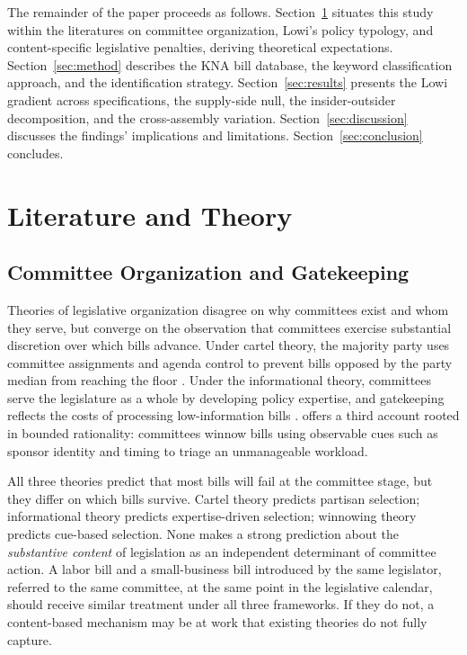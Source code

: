 \documentclass[11pt]{article}
\begin{document}
The remainder of the paper proceeds as follows. Section~\ref{sec:lit} situates this study within the literatures on committee organization, Lowi's policy typology, and content-specific legislative penalties, deriving theoretical expectations. Section~\ref{sec:method} describes the KNA bill database, the keyword classification approach, and the identification strategy. Section~\ref{sec:results} presents the Lowi gradient across specifications, the supply-side null, the insider-outsider decomposition, and the cross-assembly variation. Section~\ref{sec:discussion} discusses the findings' implications and limitations. Section~\ref{sec:conclusion} concludes.


\section{Literature and Theory}
\label{sec:lit}

\subsection{Committee Organization and Gatekeeping}
\label{sec:lit-committee}

Theories of legislative organization disagree on why committees exist and whom they serve, but converge on the observation that committees exercise substantial discretion over which bills advance. Under cartel theory, the majority party uses committee assignments and agenda control to prevent bills opposed by the party median from reaching the floor \citep{cox2005}. Under the informational theory, committees serve the legislature as a whole by developing policy expertise, and gatekeeping reflects the costs of processing low-information bills \citep{krehbiel1991}. \citet{krutz2005} offers a third account rooted in bounded rationality: committees winnow bills using observable cues such as sponsor identity and timing to triage an unmanageable workload.

All three theories predict that most bills will fail at the committee stage, but they differ on which bills survive. Cartel theory predicts partisan selection; informational theory predicts expertise-driven selection; winnowing theory predicts cue-based selection. None makes a strong prediction about the \emph{substantive content} of legislation as an independent determinant of committee action. A labor bill and a small-business bill introduced by the same legislator, referred to the same committee, at the same point in the legislative calendar, should receive similar treatment under all three frameworks. If they do not, a content-based mechanism may be at work that existing theories do not fully capture.
\end{document}
